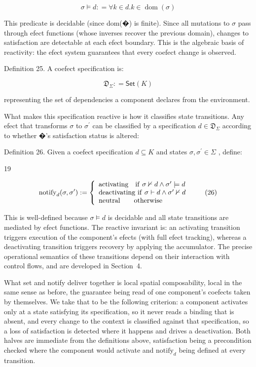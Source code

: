 \documentclass[
  10
]{article}
\begin{document}
\[
\sigma \models d : = \forall k \in d . k \in \operatorname { d o m } ( \sigma )\tag{24}
\]

This predicate is decidable (since dom(�) is finite). Since all
mutations to \(\sigma\) pass through efect functions (whose inverses
recover the previous domain), changes to satisfaction are detectable at
each efect boundary. This is the algebraic basis of reactivity: the
efect system guarantees that every coefect change is observed.

Definition 25. A coefect specification is:

\[
{ \mathfrak { D } } _ { \Sigma } : = { \mathsf { S e t } } ( K )\tag{25}
\]

representing the set of dependencies a component declares from the
environment.

What makes this specification reactive is how it classifies state
transitions. Any efect that transforms \(\sigma\) to
\(\sigma ^ { \prime }\) can be classified by a specification
\(d \in \mathfrak { D } _ { \Sigma }\) according to whether �'s
satisfaction status is altered:

Definition 26. Given a coefect specification \(d \subseteq K\) and
states \(\sigma , \sigma ^ { \prime } \in \Sigma\) , define:

19

\[
\mathrm { n o t i f y } _ { d } ( \sigma , \sigma ^ { \prime } ) : = \left\{ \begin{array} { l l } { \mathrm { a c t i v a t i n g } \quad \mathrm { i f } \ \sigma \nvdash d \land \sigma ^ { \prime } \models d } \\ { \mathrm { d e a c t i v a t i n g ~ i f } \ \sigma \vdash d \land \sigma ^ { \prime } \nvdash d } \\ { \mathrm { n e u t r a l } \quad \quad \mathrm { o t h e r w i s e } } \end{array} \right.\tag{26}
\]

This is well-defined because \(\sigma \models d\) is decidable and all
state transitions are mediated by efect functions. The reactive
invariant is: an activating transition triggers execution of the
component's efects (with full efect tracking), whereas a deactivating
transition triggers recovery by applying the accumulator. The precise
operational semantics of these transitions depend on their interaction
with control flows, and are developed in Section~4.

What set and notify deliver together is local spatial composability,
local in the same sense as before, the guarantee being read of one
component's coefects taken by themselves. We take that to be the
following criterion: a component activates only at a state satisfying
its specification, so it never reads a binding that is absent, and every
change to the context is classified against that specification, so a
loss of satisfaction is detected where it happens and drives a
deactivation. Both halves are immediate from the definitions above,
satisfaction being a precondition checked where the component would
activate and \(\mathrm { n o t i f y } _ { d }\) being defined at every
transition.
\end{document}
